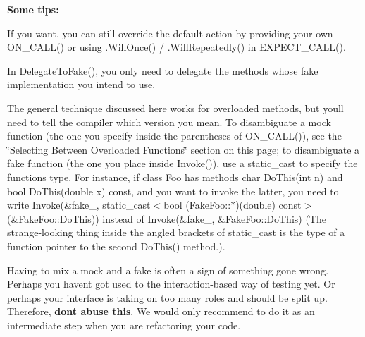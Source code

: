 \begin{DoxyCode}{0}
\DoxyCodeLine{}
\DoxyCodeLine{}
\DoxyCodeLine{}
\DoxyCodeLine{}
\DoxyCodeLine{\}}
\end{DoxyCode}


{\bfseries Some tips\+:}


\begin{DoxyItemize}
\item If you want, you can still override the default action by providing your own {\ttfamily O\+N\+\_\+\+C\+A\+L\+L()} or using {\ttfamily .Will\+Once()} / {\ttfamily .Will\+Repeatedly()} in {\ttfamily E\+X\+P\+E\+C\+T\+\_\+\+C\+A\+L\+L()}.
\item In {\ttfamily Delegate\+To\+Fake()}, you only need to delegate the methods whose fake implementation you intend to use.
\item The general technique discussed here works for overloaded methods, but you\textquotesingle{}ll need to tell the compiler which version you mean. To disambiguate a mock function (the one you specify inside the parentheses of {\ttfamily O\+N\+\_\+\+C\+A\+L\+L()}), see the \char`\"{}\+Selecting Between Overloaded Functions\char`\"{} section on this page; to disambiguate a fake function (the one you place inside {\ttfamily Invoke()}), use a {\ttfamily static\+\_\+cast} to specify the function\textquotesingle{}s type. For instance, if class {\ttfamily Foo} has methods {\ttfamily char Do\+This(int n)} and {\ttfamily bool Do\+This(double x) const}, and you want to invoke the latter, you need to write {\ttfamily Invoke(\&fake\+\_\+, static\+\_\+cast$<$bool (Fake\+Foo\+:\+:$\ast$)(double) const$>$(\&Fake\+Foo\+::\+Do\+This))} instead of {\ttfamily Invoke(\&fake\+\_\+, \&\+Fake\+Foo\+::\+Do\+This)} (The strange-\/looking thing inside the angled brackets of {\ttfamily static\+\_\+cast} is the type of a function pointer to the second {\ttfamily Do\+This()} method.).
\item Having to mix a mock and a fake is often a sign of something gone wrong. Perhaps you haven\textquotesingle{}t got used to the interaction-\/based way of testing yet. Or perhaps your interface is taking on too many roles and should be split up. Therefore, {\bfseries don\textquotesingle{}t abuse this}. We would only recommend to do it as an intermediate step when you are refactoring your code.
\end{DoxyItemize}

